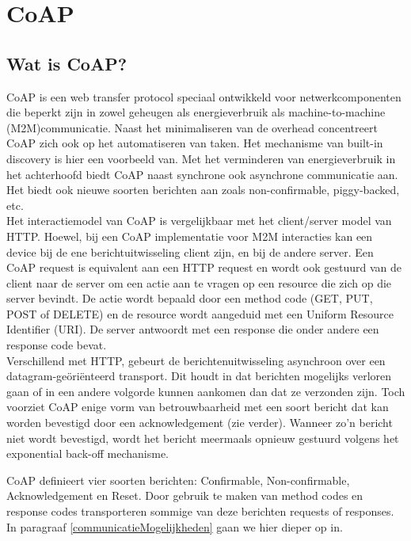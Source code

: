 \chapter{CoAP} \label{CoAP}

\section{Wat is CoAP?}

CoAP is een web transfer protocol speciaal ontwikkeld voor netwerkcomponenten die beperkt zijn in zowel geheugen als energieverbruik als machine-to-machine (M2M)communicatie. Naast het minimaliseren van de overhead concentreert CoAP zich ook op het automatiseren van taken. Het mechanisme van built-in discovery is hier een voorbeeld van. Met het verminderen van energieverbruik in het achterhoofd biedt CoAP naast synchrone ook asynchrone communicatie aan. Het biedt ook nieuwe soorten berichten aan zoals non-confirmable, piggy-backed, etc.\\

Het interactiemodel van CoAP is vergelijkbaar met het client/server model van HTTP. Hoewel, bij een CoAP implementatie voor M2M interacties kan een device bij de ene berichtuitwisseling client zijn, en bij de andere server. Een CoAP request is equivalent aan een HTTP request en wordt ook gestuurd van de client naar de server om een actie aan te vragen op een resource die zich op die server bevindt. De actie wordt bepaald door een method code (GET, PUT, POST of DELETE) en de resource wordt aangeduid met een Uniform Resource Identifier (URI). De server antwoordt met een response die onder andere een response code bevat.\\

Verschillend met HTTP, gebeurt de berichtenuitwisseling asynchroon over een datagram-ge\"{o}ri\"{e}nteerd transport. Dit houdt in dat berichten mogelijks verloren gaan of in een andere volgorde kunnen aankomen dan dat ze verzonden zijn. Toch voorziet CoAP enige vorm van betrouwbaarheid met een soort bericht dat kan worden bevestigd door een acknowledgement (zie verder). Wanneer zo'n bericht niet wordt bevestigd, wordt het bericht meermaals opnieuw gestuurd volgens het exponential back-off mechanisme.

CoAP definieert vier soorten berichten: Confirmable, Non-confirmable, Acknowledgement en Reset. Door gebruik te maken van method codes en response codes transporteren sommige van deze berichten requests of responses. In paragraaf \ref{communicatieMogelijkheden} gaan we hier dieper op in.\\


